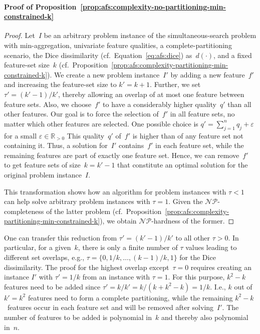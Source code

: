 \documentclass{article}
\theoremstyle{definition}
\begin{document}
\paragraph{Proof of Proposition~\ref{prop:afs:complexity-no-partitioning-min-constrained-k}}
%
\begin{proof}
Let~$I$ be an arbitrary problem instance of the simultaneous-search problem with min-aggregation, univariate feature qualities, a complete-partitioning scenario, the Dice dissimilarity (cf.~Equation~\ref{eq:afs:dice}) as~$d(\cdot)$, and a fixed feature-set size~$k$ (cf.~Proposition~\ref{prop:afs:complexity-partitioning-min-constrained-k}).
We create a new problem instance~$I'$ by adding a new feature~$f'$ and increasing the feature-set size to $k' = k + 1$.
Further, we set $\tau' = (k' - 1) / k'$, thereby allowing an overlap of at most one feature between feature sets.
Also, we choose~$f'$ to have a considerably higher quality~$q'$ than all other features.
Our goal is to force the selection of~$f'$ in all feature sets, no matter which other features are selected.
One possible choice is $q' = \sum_{j=1}^n q_j + \varepsilon$ for a small $\varepsilon \in \mathbb{R}_{> 0}$
This quality~$q'$ of~$f'$ is higher than of any feature set not containing it.
Thus, a solution for~$I'$ contains~$f'$ in each feature set, while the remaining features are part of exactly one feature set.
Hence, we can remove~$f'$ to get feature sets of size~$k = k' - 1$ that constitute an optimal solution for the original problem instance~$I$.

This transformation shows how an algorithm for problem instances with $\tau < 1$ can help solve arbitrary problem instances with $\tau = 1$.
Given the $\mathcal{NP}$-completeness of the latter problem (cf.~Proposition~\ref{prop:afs:complexity-partitioning-min-constrained-k}), we obtain $\mathcal{NP}$-hardness of the former.
\end{proof}
%
One can transfer this reduction from $\tau' = (k' - 1) / k'$ to all other $\tau > 0$.
In particular, for a given~$k$, there is only a finite number of $\tau$ values leading to different set overlaps, e.g., $\tau = \{0, 1/k, \dots, (k - 1) / k, 1\}$ for the Dice dissimilarity.
The proof for the highest overlap except~$\tau=0$ requires creating an instance $I'$ with $\tau'= 1/k$ from an instance with $\tau = 1$.
For this purpose, $k^2 - k$ features need to be added since $\tau' = k / k' = k / (k + k^2 -k) = 1/k$.
I.e., $k$ out of $k' = k^2$ features need to form a complete partitioning, while the remaining $k^2 - k$~features occur in each feature set and will be removed after solving~$I'$.
The number of features to be added is polynomial in~$k$ and thereby also polynomial in~$n$.
\end{document}
